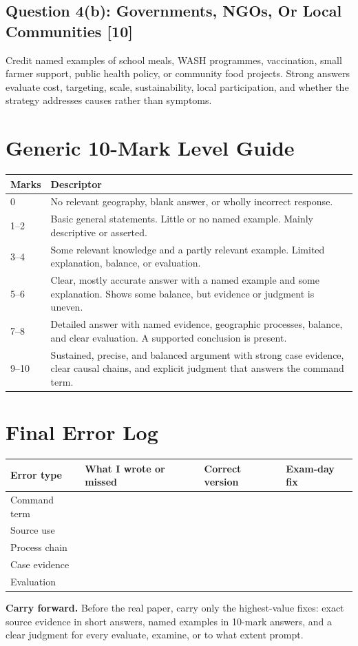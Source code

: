 \documentclass[11pt,a4paper]{article}
\newcommand{\boxnote}[3]{%
\noindent\colorbox{#1}{%
  \begin{minipage}{0.965\textwidth}
  \sffamily
  \textbf{\textcolor{HeadingBlue}{#2}} #3
  \end{minipage}
}}
\begin{document}
\subsection{Question 4(b): Governments, NGOs, Or Local Communities [10]}

Credit named examples of school meals, WASH programmes, vaccination, small
farmer support, public health policy, or community food projects. Strong
answers evaluate cost, targeting, scale, sustainability, local participation,
and whether the strategy addresses causes rather than symptoms.

\newpage

\section{Generic 10-Mark Level Guide}

\begin{tabularx}{\textwidth}{L{0.14\textwidth}Y}
\toprule
\textbf{Marks} & \textbf{Descriptor} \\
 & No relevant geography, blank answer, or wholly incorrect response. \\
1--2 & Basic general statements. Little or no named example. Mainly descriptive
or asserted. \\
3--4 & Some relevant knowledge and a partly relevant example. Limited
explanation, balance, or evaluation. \\
5--6 & Clear, mostly accurate answer with a named example and some explanation.
Shows some balance, but evidence or judgment is uneven. \\
7--8 & Detailed answer with named evidence, geographic processes, balance, and
clear evaluation. A supported conclusion is present. \\
9--10 & Sustained, precise, and balanced argument with strong case evidence,
clear causal chains, and explicit judgment that answers the command term. \\
\bottomrule
\end{tabularx}

\section{Final Error Log}

\begin{tabularx}{\textwidth}{L{0.18\textwidth}Y Y Y}
\toprule
\textbf{Error type} & \textbf{What I wrote or missed} & \textbf{Correct version} & \textbf{Exam-day fix} \\
\midrule
Command term & \rule{0pt}{1.35cm} & & \\
Source use & \rule{0pt}{1.35cm} & & \\
Process chain & \rule{0pt}{1.35cm} & & \\
Case evidence & \rule{0pt}{1.35cm} & & \\
Evaluation & \rule{0pt}{1.35cm} & & \\
\bottomrule
\end{tabularx}

\boxnote{SoftGreen}{Carry forward.}{Before the real paper, carry only the
highest-value fixes: exact source evidence in short answers, named examples in
10-mark answers, and a clear judgment for every evaluate, examine, or to what
extent prompt.}
\end{document}
